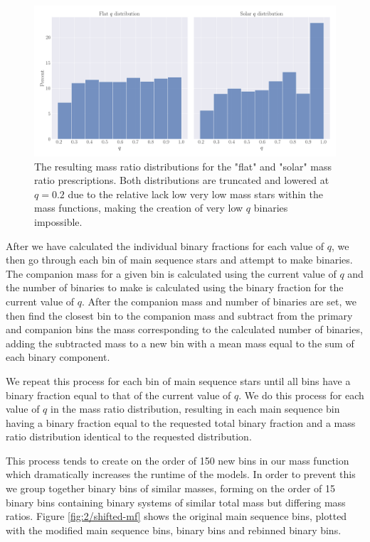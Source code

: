 \begin{figure}
	\centering
	\includegraphics[width=\textwidth]{figures/q-dists.png}
	\caption{The resulting mass ratio distributions for the "flat" and "solar" mass ratio
		prescriptions. Both distributions are truncated and lowered at $q=0.2$ due to the
		relative lack low very low mass stars within the mass functions, making the creation
		of very low $q$ binaries impossible.}
	\label{fig:2/q-dists}
\end{figure}


After we have calculated the individual binary fractions for each value of $q$, we then go through
each bin of main sequence stars and attempt to make binaries. The companion mass for a given bin is
calculated using the current value of $q$ and the number of binaries to make is calculated using the
binary fraction for the current value of $q$. After the companion mass and number of binaries are
set, we then find the closest bin to the companion mass and subtract from the primary and companion
bins the mass corresponding to the calculated number of binaries, adding the subtracted mass to a
new bin with a mean mass equal to the sum of each binary component.


We repeat this process for each bin of main sequence stars until all bins have a binary fraction
equal to that of the current value of $q$. We do this process for each value of $q$ in the mass
ratio distribution, resulting in each main sequence bin having a binary fraction equal to the
requested total binary fraction and a mass ratio distribution identical to the requested
distribution.


This process tends to create on the order of 150 new bins in our mass function which dramatically
increases the runtime of the  models. In order to prevent this we group together binary
bins of similar masses, forming on the order of 15 binary bins containing binary systems of similar
total mass but differing mass ratios. Figure \ref{fig:2/shifted-mf} shows the original main sequence
bins, plotted with the modified main sequence bins, binary bins and rebinned binary bins.


